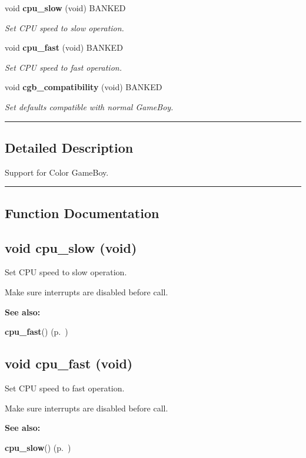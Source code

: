 \begin{CompactItemize}
\item 
void {\bf cpu\_\-slow} (void) BANKED
\begin{CompactList}\small\item\em Set CPU speed to slow operation.\item\end{CompactList}

\item 
void {\bf cpu\_\-fast} (void) BANKED
\begin{CompactList}\small\item\em Set CPU speed to fast operation.\item\end{CompactList}

\item 
\label{cgb.h_a27}
void {\bf cgb\_\-compatibility} (void) BANKED
\begin{CompactList}\small\item\em Set defaults compatible with normal Game\-Boy.\item\end{CompactList}

\end{CompactItemize}
\vspace{0.4cm}\hrule\vspace{0.2cm}
\subsection*{Detailed Description}
Support for Color Game\-Boy.\vspace{0.4cm}\hrule\vspace{0.2cm}
\subsection*{Function Documentation}
\label{cgb.h_a25}
\subsection{\setlength{\rightskip}{0pt plus 5cm}void cpu\_\-slow (void)}

Set CPU speed to slow operation.

Make sure interrupts are disabled before call.

\begin{Desc}
\item[{\bf See also: }]\par
{\bf cpu\_\-fast}() {\rm (p.~\pageref{cgb.h_a26})} \end{Desc}
\label{cgb.h_a26}
\subsection{\setlength{\rightskip}{0pt plus 5cm}void cpu\_\-fast (void)}

Set CPU speed to fast operation.

Make sure interrupts are disabled before call.

\begin{Desc}
\item[{\bf See also: }]\par
{\bf cpu\_\-slow}() {\rm (p.~\pageref{cgb.h_a25})} \end{Desc}
